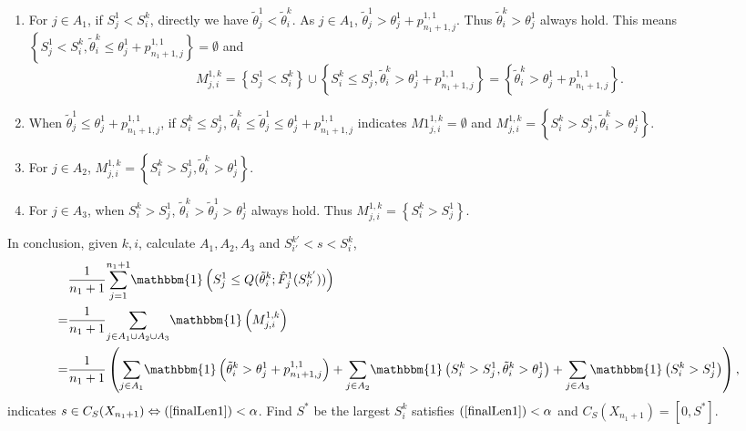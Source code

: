 \documentclass[12pt, a4paper, oneside]{article}
\begin{document}
    \begin{enumerate}
        \item For $j\in A_1$, if $S_j^1<S_i^k$, directly we have $\tilde{\theta}_j^1<\tilde{\theta}_i^k$. As $j\in A_1$, $\tilde{\theta}_j^1>\theta_j^1+p_{n_1+1,j}^{1,1}$. Thus $\tilde{\theta}_{i}^{k}>\theta_j^1$ always hold. This means $\left\{ S_j^1<S_i^k,\tilde{\theta}_{i}^{k}\leq\theta_j^1+p_{n_1+1,j}^{1,1} \right\}=\emptyset$ and
        \begin{equation*}
            M_{j,i}^{1,k}=\left\{ S_j^1<S_i^k \right\}\cup\left\{ S_{i}^{k}\leq S_j^1,\tilde{\theta}_{i}^{k}>\theta_j^1+p_{n_1+1,j}^{1,1} \right\}=\left\{ \tilde{\theta}_{i}^{k}>\theta_j^1+p_{n_1+1,j}^{1,1} \right\}.
        \end{equation*}
        \item When $\tilde{\theta}_j^1\leq\theta_j^1+p_{n_1+1,j}^{1,1}$, if $S_i^k\leq S_j^1$, $\tilde{\theta}_i^k\leq\tilde{\theta}_j^1\leq\theta_j^1+p_{n_1+1,j}^{1,1}$ indicates $M1_{j,i}^{1,k}=\emptyset$ and $M_{j,i}^{1,k}=\left\{ S_{i}^{k}>S_j^1,\tilde{\theta}_{i}^{k}>\theta_j^1 \right\}$.
        \item For $j\in A_2$, $M_{j,i}^{1,k}=\left\{ S_{i}^{k}>S_j^1,\tilde{\theta}_{i}^{k}>\theta_j^1 \right\}$.
        \item For $j\in A_3$, when $S_i^k>S_j^1$, $\tilde{\theta}_{i}^{k}>\tilde{\theta}_{j}^{1}>\theta_j^1$ always hold. Thus $M_{j,i}^{1,k}=\left\{ S_{i}^{k}>S_j^1 \right\}$.
    \end{enumerate}
    In conclusion, given $k,i$, calculate $A_1,A_2,A_3$ and $S_{i'}^{k'}<s<S_{i}^{k}$,
    \begin{align}
        &\dfrac{1}{n_1+1}\overset{n_1+1}{\underset{j=1}\sum}\mathbbm{1}\left( S_j^1\leq Q(\tilde{\theta}_{i}^{k};\hat{F}_j^1(S_{i'}^{k'})) \right)\notag\\
        =&\dfrac{1}{n_1+1}\overset{}{\underset{j\in A_1\cup A_2\cup A_3}\sum}\mathbbm{1}\left( M_{j,i}^{1,k} \right)\notag\\
        =&\dfrac{1}{n_1+1}\left( \overset{}{\underset{j\in A_1}\sum}\mathbbm{1}\left( \tilde{\theta}_{i}^{k}>\theta_j^1+p_{n_1+1,j}^{1,1} \right)+\overset{}{\underset{j\in A_2}\sum}\mathbbm{1}\left( S_{i}^{k}>S_j^1,\tilde{\theta}_{i}^{k}>\theta_j^1 \right)+\overset{}{\underset{j\in A_3}\sum}\mathbbm{1}\left( S_{i}^{k}>S_j^1 \right) \right),\label{finalLen1}
    \end{align}
    indicates $s\in C_S(X_{n_1+1})\Leftrightarrow\text{(\ref{finalLen1})}<\alpha$. Find $S^*$ be the largest $S_i^k$ satisfies $\text{(\ref{finalLen1})}<\alpha$ and $C_S(X_{n_1+1})=[0,S^*]$.
\end{document}
